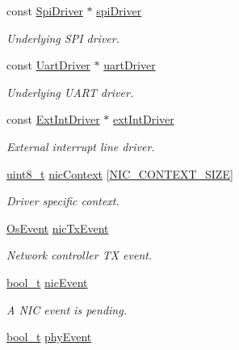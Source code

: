 \begin{DoxyCompactItemize}
const \hyperlink{structSpiDriver}{Spi\+Driver} $\ast$ \hyperlink{struct__NetInterface_a693b3caefa91a895d2cc996b021d609c}{spi\+Driver}
\begin{DoxyCompactList}\small\item\em Underlying S\+PI driver. \end{DoxyCompactList}\item 
const \hyperlink{structUartDriver}{Uart\+Driver} $\ast$ \hyperlink{struct__NetInterface_a8af760257f2838655e488e3a86a0af7c}{uart\+Driver}
\begin{DoxyCompactList}\small\item\em Underlying U\+A\+RT driver. \end{DoxyCompactList}\item 
const \hyperlink{structExtIntDriver}{Ext\+Int\+Driver} $\ast$ \hyperlink{struct__NetInterface_a8b71f7fc40c4944a1b9f3b0cc9a51ad9}{ext\+Int\+Driver}
\begin{DoxyCompactList}\small\item\em External interrupt line driver. \end{DoxyCompactList}\item 
\hyperlink{stdint_8h_aba7bc1797add20fe3efdf37ced1182c5}{uint8\+\_\+t} \hyperlink{struct__NetInterface_a0e5c02065f67e6b93ef268fc06e70d50}{nic\+Context} \mbox{[}\hyperlink{nic_8h_aae102aeec82fff42fcadd719a6cf41c2}{N\+I\+C\+\_\+\+C\+O\+N\+T\+E\+X\+T\+\_\+\+S\+I\+ZE}\mbox{]}
\begin{DoxyCompactList}\small\item\em Driver specific context. \end{DoxyCompactList}\item 
\hyperlink{structOsEvent}{Os\+Event} \hyperlink{struct__NetInterface_aa46ad2e464a331ea931fa829af394c8b}{nic\+Tx\+Event}
\begin{DoxyCompactList}\small\item\em Network controller TX event. \end{DoxyCompactList}\item 
\hyperlink{compiler__port_8h_a812d16e5494522586b3784e55d479912}{bool\+\_\+t} \hyperlink{struct__NetInterface_a594b38fa99d44e8c8ba0a697848ac3ac}{nic\+Event}
\begin{DoxyCompactList}\small\item\em A N\+IC event is pending. \end{DoxyCompactList}\item 
\hyperlink{compiler__port_8h_a812d16e5494522586b3784e55d479912}{bool\+\_\+t} \hyperlink{struct__NetInterface_a56b6ecff7a2d35f6f2dddf2d7c9b3a21}{phy\+Event}

\end{DoxyCompactItemize}
